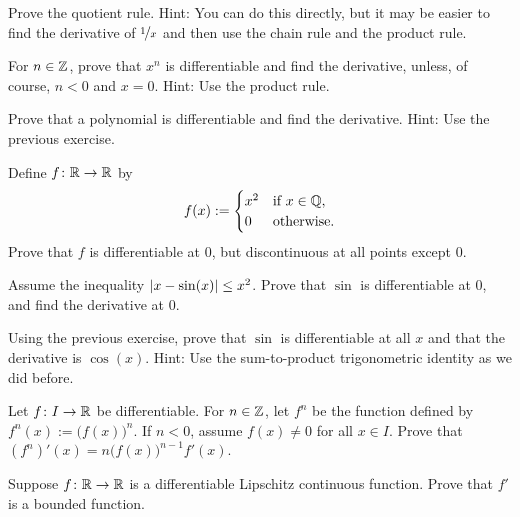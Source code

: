 \begin{exercise}
Prove the quotient rule.  Hint: You can do this directly, but it may be
easier to find the derivative of $\nicefrac{1}{x}$ and then use
the chain rule and the product rule.
\end{exercise}

\begin{exercise} \label{exercise:diffofxn}
For $n \in {\mathbb{Z}}$,
prove that $x^n$ is differentiable and find the derivative,
unless, of course, $n < 0$ and $x=0$.
Hint: Use the product rule.
\end{exercise}

\begin{exercise}
Prove that a polynomial is differentiable and find the derivative.
Hint: Use the previous exercise.
\end{exercise}

\begin{exercise}
Define $f \colon {\mathbb{R}} \to {\mathbb{R}}$ by
\begin{equation*}
f(x) :=
\begin{cases}
x^2 & \text{if } x \in {\mathbb{Q}},\\
0 & \text{otherwise.}
\end{cases}
\end{equation*}
Prove that $f$ is differentiable at $0$, but discontinuous at all points
except $0$.
\end{exercise}

\begin{exercise}
Assume the inequality $\left\lvert {x-\sin(x)} \right\rvert \leq x^2$.  Prove that $\sin$ is
differentiable at $0$, and find the derivative at $0$.
\end{exercise}

\begin{exercise}
Using the previous exercise, prove that $\sin$ is differentiable at all $x$
and that the derivative is $\cos(x)$.  Hint: Use the sum-to-product
trigonometric identity as we did before.
\end{exercise}

\begin{exercise}
Let $f \colon I \to {\mathbb{R}}$ be differentiable.  For $n \in {\mathbb{Z}}$, let $f^n$
be the function defined by $f^n(x) := {\bigl( f(x) \bigr)}^n$.  If
$n < 0$, assume $f(x) \not= 0$ for all $x \in I$.  Prove that
$(f^n)'(x) = n {\bigl(f(x) \bigr)}^{n-1} f'(x)$.
\end{exercise}

\begin{exercise}
Suppose $f \colon {\mathbb{R}} \to {\mathbb{R}}$ is a differentiable
Lipschitz continuous function.
Prove that $f'$ is a bounded function.
\end{exercise}

